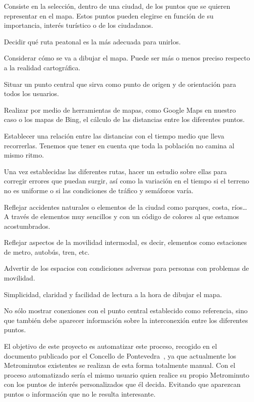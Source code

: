 \begin{steps}
	\item Consiste en la selección, dentro de una ciudad, de los puntos que se quieren representar en el mapa. Estos puntos pueden elegirse en función de su importancia, interés turístico o de los ciudadanos.
	\item Decidir qué ruta peatonal es la más adecuada para unirlos.
	\item Considerar cómo se va a dibujar el mapa. Puede ser más o menos preciso respecto a la realidad cartográfica.
	\item Situar un punto central que sirva como punto de origen y de orientación para todos los usuarios.
	\item Realizar por medio de herramientas de mapas, como Google Maps en nuestro caso o los mapas de Bing, el cálculo de las distancias entre los diferentes puntos.
	\item Establecer una relación entre las distancias con el tiempo medio que lleva recorrerlas. Tenemos que tener en cuenta que toda la población no camina al mismo ritmo.
	\item Una vez establecidas las diferentes rutas, hacer un estudio sobre ellas para corregir errores que puedan surgir, así como la variación en el tiempo si el terreno no es uniforme o si las condiciones de tráfico y semáforos varía.
	\item Reflejar accidentes naturales o elementos de la ciudad como parques, costa, ríos\dots A través de elementos muy sencillos y con un código de colores al que estamos acostumbrados.
	\item Reflejar aspectos de la movilidad intermodal, es decir, elementos como estaciones de metro, autobús, tren, etc. 
	\item Advertir de los espacios con condiciones adversas para personas con problemas de movilidad.
	\item Simplicidad, claridad y facilidad de lectura a la hora de dibujar el mapa.
	\item No sólo mostrar conexiones con el punto central establecido como referencia, sino que también debe aparecer información sobre la interconexión entre los diferentes puntos.
\end{steps}

El objetivo de este proyecto es automatizar este proceso, recogido en el documento publicado por el Concello de Pontevedra~\cite{metrominuto}, ya que actualmente los Metrominutos existentes se realizan de esta forma totalmente manual. Con el proceso automatizado sería el mismo usuario quien realice su propio Metrominuto con los puntos de interés personalizados que él decida. Evitando que aparezcan puntos o información que no le resulta interesante.



